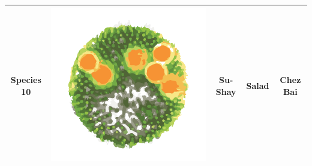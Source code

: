 \begin{table}
\begin{tabular}{ | c | c | c | c | c | }
Species 10 & \includegraphics[valign=m,scale=0.1]{images/species_10.png} & Su-Shay & Salad & Chez Bai \\ 
\hline
\end{tabular}
\label{tab:species_names}
\end{table}

